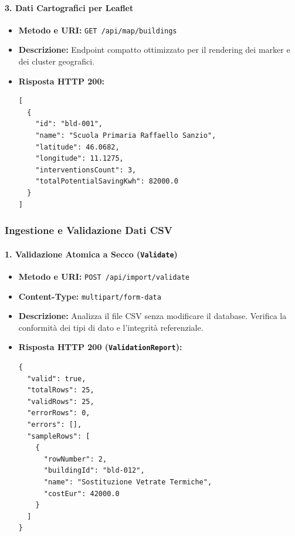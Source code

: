 \paragraph{3. Dati Cartografici per Leaflet}
\begin{itemize}[leftmargin=1.4em, itemsep=0.1em]
    \item \textbf{Metodo e URI:} \texttt{GET /api/map/buildings}
    \item \textbf{Descrizione:} Endpoint compatto ottimizzato per il rendering dei marker e dei cluster geografici.
    \item \textbf{Risposta HTTP 200:}
\begin{lstlisting}
[
  {
    "id": "bld-001",
    "name": "Scuola Primaria Raffaello Sanzio",
    "latitude": 46.0682,
    "longitude": 11.1275,
    "interventionsCount": 3,
    "totalPotentialSavingKwh": 82000.0
  }
]
\end{lstlisting}
\end{itemize}

\subsubsection{Ingestione e Validazione Dati CSV}

\paragraph{1. Validazione Atomica a Secco (\texttt{Validate})}
\begin{itemize}[leftmargin=1.4em, itemsep=0.1em]
    \item \textbf{Metodo e URI:} \texttt{POST /api/import/validate}
    \item \textbf{Content-Type:} \texttt{multipart/form-data}
    \item \textbf{Descrizione:} Analizza il file CSV senza modificare il database. Verifica la conformità dei tipi di dato e l'integrità referenziale.
    \item \textbf{Risposta HTTP 200 (\texttt{ValidationReport}):}
\begin{lstlisting}
{
  "valid": true,
  "totalRows": 25,
  "validRows": 25,
  "errorRows": 0,
  "errors": [],
  "sampleRows": [
    {
      "rowNumber": 2,
      "buildingId": "bld-012",
      "name": "Sostituzione Vetrate Termiche",
      "costEur": 42000.0
    }
  ]
}
\end{lstlisting}
\end{itemize}

